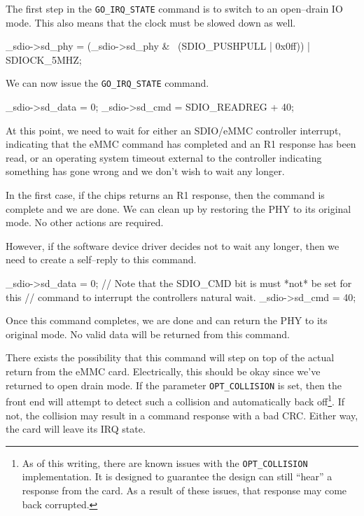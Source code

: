 \documentclass{gqtekspec}
\begin{document}
The first step in the {\tt GO\_IRQ\_STATE} command is to switch to an
open--drain IO mode.  This also means that the clock must be slowed down
as well.

\begin{zCpp}
	_sdio->sd_phy = (_sdio->sd_phy & ~(SDIO_PUSHPULL | 0x0ff))
			| SDIOCK_5MHZ;
\end{zCpp}

We can now issue the {\tt GO\_IRQ\_STATE} command.

\begin{zCpp}
	_sdio->sd_data = 0;
	_sdio->sd_cmd  = SDIO_READREG + 40;
\end{zCpp}

At this point, we need to wait for either an SDIO/eMMC controller interrupt,
indicating that the eMMC command has completed and an R1 response has been
read, or an operating system timeout external to the controller indicating
something has gone wrong and we don't wish to wait any longer.

In the first case, if the chips returns an R1 response, then the command is
complete and we are done.  We can clean up by restoring the PHY to its
original mode.  No other actions are required.

However, if the software device driver decides not to wait any longer,
then we need to create a self--reply to this command.

\begin{zCpp}
	_sdio->sd_data = 0;
	// Note that the SDIO_CMD bit is must *not* be set for this
	// command to interrupt the controllers natural wait.
	_sdio->sd_cmd  = 40;
\end{zCpp}

Once this command completes, we are done and can return the PHY to its original
mode.  No valid data will be returned from this command.

There exists the possibility that this command will step on top of the
actual return from the eMMC card.  Electrically, this should be okay since
we've returned to open drain mode.  If the parameter {\tt OPT\_COLLISION}
is set, then the front end will attempt to detect such a collision and
automatically back off\footnote{As of this writing, there are known issues
with the {\tt OPT\_COLLISION} implementation.  It is designed to guarantee
the design can still ``hear'' a response from the card.  As a result of these
issues, that response may come back corrupted.}.  If not, the collision may
result in a command response with a bad CRC.  Either way, the card will
leave its IRQ state.
\end{document}
